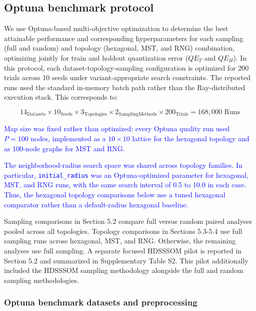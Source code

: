 \documentclass[10pt]{article} %
\newcommand{\TrackedChange}[1]{\textcolor{blue}{#1}}
\begin{document}
\subsection{Optuna benchmark protocol}

We use Optuna-based multi-objective optimization to determine the best attainable performance and corresponding hyperparameters for each sampling (full and random) and topology (hexagonal, MST, and RNG) combination, optimizing jointly for train and holdout quantization error ($QE_T$ and $QE_H$). In this protocol, each dataset-topology-sampling configuration is optimized for 200 trials across 10 seeds under variant-appropriate search constraints. The reported runs used the standard in-memory batch path rather than the Ray-distributed execution stack. This corresponds to:

\begin{equation*}
14_{\text{Datasets}} \times 10_{\text{Seeds}} \times 3_{\text{Topologies}} \times 2_{\text{SamplingMethods}} \times 200_{\text{Trials}}= 168{,}000 \text{ Runs}
\end{equation*}

\TrackedChange{Map size was fixed rather than optimized: every Optuna quality run used $P=100$ nodes, implemented as a $10\times10$ lattice for the hexagonal topology and as 100-node graphs for MST and RNG.}

\TrackedChange{The neighborhood-radius search space was shared across topology families.} \TrackedChange{In particular, \texttt{initial\_radius} was an Optuna-optimized parameter for hexagonal, MST, and RNG runs, with the same search interval of 0.5 to 10.0 in each case.} \TrackedChange{Thus, the hexagonal topology comparisons below use a tuned hexagonal comparator rather than a default-radius hexagonal baseline.}

Sampling comparisons in Section 5.2 compare full versus random paired analyses pooled across all topologies. Topology comparisons in Sections 5.3-5.4 use full sampling runs across hexagonal, MST, and RNG. Otherwise, the remaining analyses use full sampling. A separate focused HDSSSOM pilot is reported in Section 5.2 and summarized in Supplementary Table S2. This pilot additionally included the HDSSSOM sampling methodology alongside the full and random sampling methodologies.

\subsubsection{Optuna benchmark datasets and preprocessing}
\end{document}

